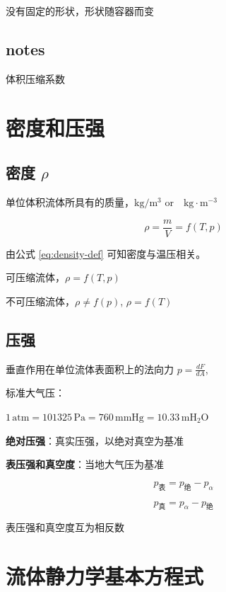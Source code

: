 \documentclass{book}
\DeclareRobustCommand{\bluebold}[1]{\textbf{\textcolor[rgb]{0.31,0.63,0.86}{#1}}}
\begin{document}
没有固定的形状，形状随容器而变

\section*{notes}

体积压缩系数

\chapter{密度和压强}

\section{密度 \texorpdfstring{$\rho$}{密度 ρ}}

单位体积流体所具有的质量，$\mathrm{kg/m^3}$ or$\quad \mathrm{kg\cdot m^{-3}}$

\begin{equation}
\rho = \frac{m}{V} = f(T,p)
\label{eq:density-def}
\end{equation}

由公式 \ref{eq:density-def} 可知密度与温压相关。

可压缩流体，$\rho = f(T,p)$

不可压缩流体，$\rho \neq f(p)$, $\rho = f(T)$

\section{压强}

垂直作用在单位流体表面积上的法向力 $p = \frac{dF}{dA}$, 

标准大气压：

$\mathrm{1\,atm} = \mathrm{101325\,Pa} = \mathrm{760\,mmHg} = \mathrm{10.33\,mH_2O}$

\bluebold{绝对压强}：真实压强，以绝对真空为基准

\bluebold{表压强和真空度}：当地大气压为基准

\begin{equation}
p_\text{表} = p_\text{绝} - p_\alpha
\end{equation}

\begin{equation}
p_\text{真} = p_\alpha - p_\text{绝}
\end{equation}

表压强和真空度互为相反数

\chapter{流体静力学基本方程式}
\end{document}
